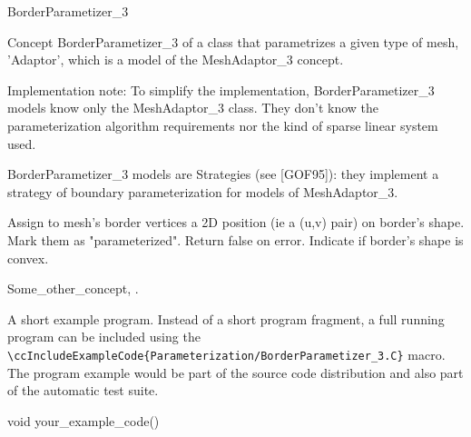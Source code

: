 

\begin{ccRefConcept}{BorderParametizer_3}


\ccDefinition

Concept BorderParametizer\_3 of a class that parametrizes a given type of mesh, 'Adaptor', which is a model of the MeshAdaptor\_3 concept.

Implementation note: To simplify the implementation, BorderParametizer\_3 models know only the MeshAdaptor\_3 class. They don't know the parameterization algorithm requirements nor the kind of sparse linear system used.



BorderParametizer\_3 models are Strategies (see [GOF95]): they implement a strategy of boundary parameterization for models of MeshAdaptor\_3.


\ccTypes


{
}
{
}


\ccCreation
{}  %


\ccOperations

{
Assign to mesh's border vertices a 2D position (ie a (u,v) pair) on border's shape. Mark them as "parameterized". Return false on error.
}
{
Indicate if border's shape is convex.
}


\ccSeeAlso

Some\_other\_concept,
.

\ccExample

A short example program.
Instead of a short program fragment, a full running program can be
included using the
\verb|\ccIncludeExampleCode{Parameterization/BorderParametizer_3.C}|
macro. The program example would be part of the source code distribution and
also part of the automatic test suite.

\begin{ccExampleCode}
void your_example_code() {
}
\end{ccExampleCode}


\end{ccRefConcept}



